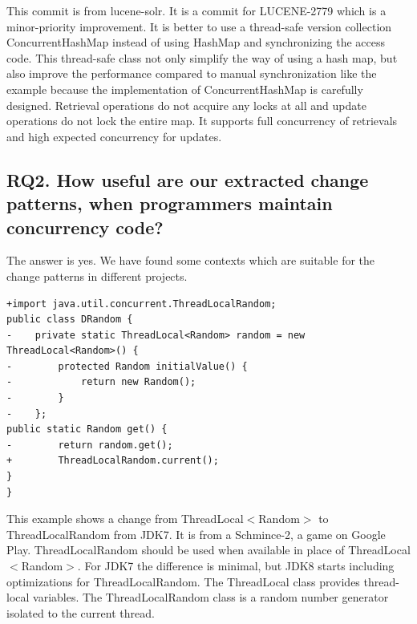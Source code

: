 This commit is from lucene-solr. It is a commit for LUCENE-2779 which is a minor-priority improvement. It is better to use a thread-safe version collection ConcurrentHashMap instead of using HashMap and synchronizing the access code. This thread-safe class not only simplify the way of using a hash map, but also improve the performance compared to manual synchronization like the example because the implementation of ConcurrentHashMap is carefully designed. Retrieval operations do not acquire any locks at all and update operations do not lock the entire map. It supports full concurrency of retrievals and high expected concurrency for updates.

%
%
%
%
%
%

\subsection{RQ2. How useful are our extracted change patterns, when programmers maintain concurrency code?}
\label{sec:result:sample}
The answer is yes. We have found some contexts which are suitable for the change patterns in different projects.

\begin{lstlisting}
+import java.util.concurrent.ThreadLocalRandom;
public class DRandom {
-    private static ThreadLocal<Random> random = new ThreadLocal<Random>() {
-        protected Random initialValue() {
-            return new Random();
-        }
-    };
public static Random get() {
-        return random.get();
+        ThreadLocalRandom.current();
}
}
\end{lstlisting}

This example shows a change from ThreadLocal$<$Random$>$ to ThreadLocalRandom from JDK7. It is from a Schmince-2, a game on Google Play. ThreadLocalRandom should be used when available in place of ThreadLocal$<$Random$>$. For JDK7 the difference is minimal, but JDK8 starts including optimizations for ThreadLocalRandom. The ThreadLocal class provides thread-local variables. The ThreadLocalRandom class is a random number generator isolated to the current thread.

